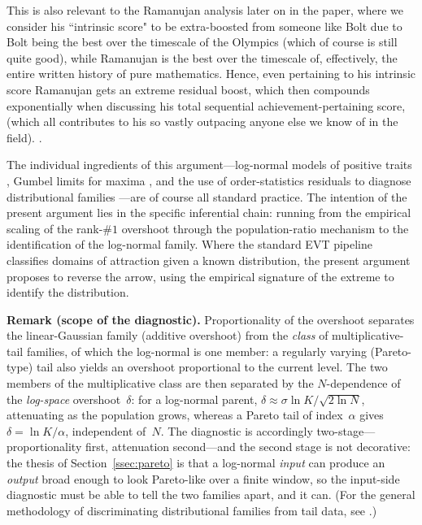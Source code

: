 \documentclass{article}
\begin{document}
{This is also relevant to the Ramanujan analysis later on in the paper, where we consider his ``intrinsic score" to be extra-boosted from someone like Bolt due to Bolt being the best over the timescale of the Olympics (which of course is still quite good), while Ramanujan is the best over the timescale of, effectively, the entire written history of pure mathematics. Hence, even pertaining to his intrinsic score Ramanujan gets an extreme residual boost, which then compounds exponentially when discussing his total sequential achievement-pertaining score, (which all contributes to his so vastly outpacing anyone else we know of in the field).
}.

\medskip

The individual ingredients of this argument---log-normal models
of positive traits \cite{gibrat1931}, Gumbel limits for maxima
\cite{fisher1928,gnedenko1943}, and the use of order-statistics residuals to
diagnose distributional families \cite{embrechts1997}---are of course all standard practice.
The intention of the present argument lies in the specific inferential
chain: running from the empirical scaling of the rank-$\#1$ overshoot
through the population-ratio mechanism to the identification of the
log-normal family. Where the standard EVT pipeline classifies domains of
attraction given a known distribution, the present argument proposes to reverse
the arrow, using the empirical signature of the extreme to identify the
distribution.

\medskip
\noindent\textbf{Remark (scope of the diagnostic).}\;
Proportionality of the overshoot separates the linear-Gaussian family
(additive overshoot) from the \emph{class} of multiplicative-tail
families, of which the log-normal is one member: a regularly varying
(Pareto-type) tail also yields an overshoot proportional to the current
level. The two members of the multiplicative class are then separated by
the $N$-dependence of the \emph{log-space} overshoot~$\delta$: for a
log-normal parent, $\delta \approx \sigma \ln K / \sqrt{2\ln N}$,
attenuating as the population grows, whereas a Pareto tail of
index~$\alpha$ gives $\delta = \ln K / \alpha$, independent of~$N$. The
diagnostic is accordingly two-stage---proportionality first, attenuation
second---and the second stage is not decorative: the thesis of Section~\ref{ssec:pareto} is that a log-normal \emph{input} can produce an \emph{output} broad enough to look Pareto-like over a finite window, so the input-side diagnostic must be able to tell the two families apart, and it can.
(For the general methodology of discriminating distributional families
from tail data, see \cite{clauset2009power}.)
\end{document}
